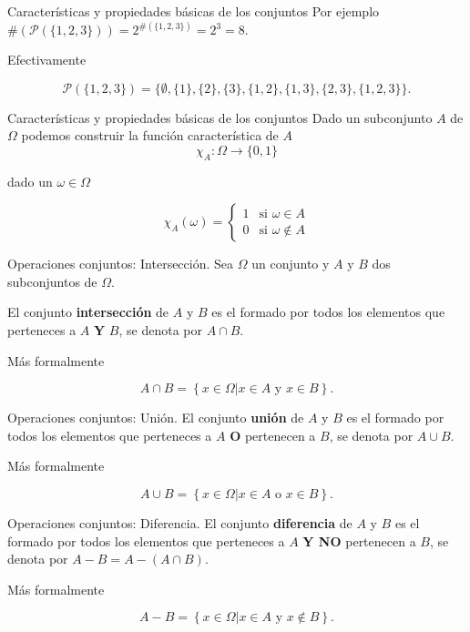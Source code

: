 \documentclass[
  ignorenonframetext,
  aspectratio=169]{beamer}
\begin{document}
\begin{frame}{Características y propiedades básicas de los conjuntos}
\protect\hypertarget{caracteruxedsticas-y-propiedades-buxe1sicas-de-los-conjuntos-4}{}
Por ejemplo
\(\#\left(\mathcal{P}(\{1,2,3\})\right)=2^{\#(\{1,2,3\})}=2^3=8.\)

Efectivamente

\[\mathcal{P}(\{1,2,3\})=\{\emptyset,\{1\},\{2\},\{3\},\{1,2\},\{1,3\},\{2,3\},\{1,2,3\}\}.\]
\end{frame}

\begin{frame}{Características y propiedades básicas de los conjuntos}
\protect\hypertarget{caracteruxedsticas-y-propiedades-buxe1sicas-de-los-conjuntos-5}{}
Dado un subconjunto \(A\) de \(\Omega\) podemos construir la función
característica de \(A\) \[\chi_A:\Omega \to \{0,1\}\]

dado un \(\omega\in \Omega\)

\[
\chi_A(\omega)=
\left\{
\begin{array}{ll}
1 &  \mbox{si }\omega \in A\\
0 &  \mbox{si }\omega \not\in A
\end{array}
\right.
\]
\end{frame}

\begin{frame}{Operaciones conjuntos: Intersección.}
\protect\hypertarget{operaciones-conjuntos-intersecciuxf3n.}{}
Sea \(\Omega\) un conjunto y \(A\) y \(B\) dos subconjuntos de
\(\Omega\).

El conjunto \textbf{intersección} de \(A\) y \(B\) es el formado por
todos los elementos que perteneces a \(A\) \textbf{Y} \(B\), se denota
por \(A\cap B\).

Más formalmente

\[
A\cap B=\left\{x\in\Omega \big| x\in A \mbox{ y } x\in B\right\}.
\]
\end{frame}

\begin{frame}{Operaciones conjuntos: Unión.}
\protect\hypertarget{operaciones-conjuntos-uniuxf3n.}{}
El conjunto \textbf{unión} de \(A\) y \(B\) es el formado por todos los
elementos que perteneces a \(A\) \textbf{O} pertenecen a \(B\), se
denota por \(A\cup B\).

Más formalmente

\[
A\cup B=\left\{x\in\Omega \big| x\in A \mbox{ o } x\in B\right\}.
\]
\end{frame}

\begin{frame}{Operaciones conjuntos: Diferencia.}
\protect\hypertarget{operaciones-conjuntos-diferencia.}{}
El conjunto \textbf{diferencia} de \(A\) y \(B\) es el formado por todos
los elementos que perteneces a \(A\) \textbf{Y NO} pertenecen a \(B\),
se denota por \(A-B=A-(A\cap B)\).

Más formalmente

\[
A- B=\left\{x\in\Omega \big| x\in A \mbox{ y } x\notin B\right\}.
\]
\end{frame}
\end{document}
